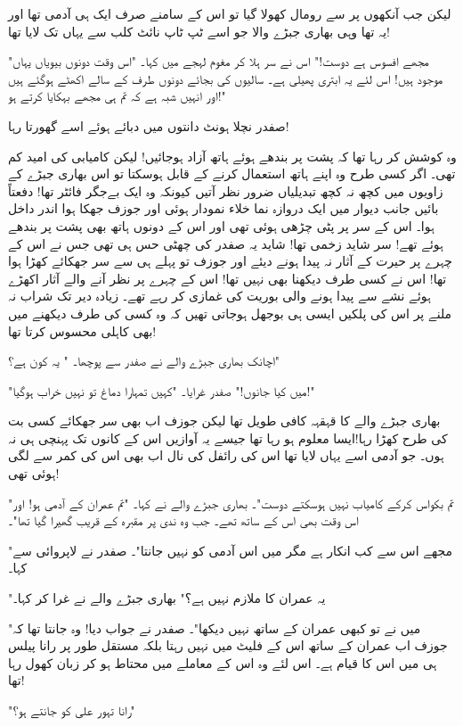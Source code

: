 لیکن جب آنکھوں پر سے رومال کھولا گیا تو اس کے سامنے صرف ایک ہی آدمی تھا اور یہ تھا وہی بھاری جبڑے والا جو اسے ٹپ ٹاپ نائٹ کلب سے یہاں تک لایا تھا!

"مجھے افسوس ہے دوست!" اس نے سر ہلا کر مغوم لہجے میں کہا۔ "اس وقت دونوں بیویاں یہاں موجود ہیں! اس لئے یہ ابتری پھیلی ہے۔ سالیوں کی بجائے دونوں طرف کے سالے اکھٹے ہوگئے ہیں اور انہیں شبہ ہے کہ تم ہی مجھے بہکایا کرتے ہو!"

صفدر نچلا ہونٹ دانتوں میں دبائے ہوئے اسے گھورتا رہا!

وہ کوشش کر رہا تھا کہ پشت پر بندھے ہوئے ہاتھ آزاد ہوجائیں! لیکن کامیابی کی امید کم تھی۔ اگر کسی طرح وہ اپنے ہاتھ استعمال کرنے کے قابل ہوسکتا تو اس بھاری جبڑے کے زاویوں میں کچھ نہ کچھ تبدیلیاں ضرور نظر آتیں کیونکہ وہ ایک بےجگر فائٹر تھا!
دفعتاً بائیں جانب دیوار میں ایک دروازہ نما خلاء نمودار ہوئی اور جوزف جھکا ہوا اندر داخل ہوا۔ اس کے سر پر پٹی چڑھی ہوئی تھی اور اس کے دونوں ہاتھ بھی پشت پر بندھے ہوئے تھے! سر شاید زخمی تھا! شاید یہ صفدر کی چھٹی حس ہی تھی جس نے اس کے چہرے پر حیرت کے آثار نہ پیدا ہونے دیئے اور جوزف تو پہلے ہی سے سر جھکائے کھڑا ہوا تھا! اس نے کسی طرف دیکھنا بھی نہیں تھا! اس کے چہرے پر نظر آنے والے آثار اکھڑے ہوئے نشے سے پیدا ہونے والی بوریت کی غمازی کر رہے تھے۔ زیادہ دیر تک شراب نہ ملنے پر اس کی پلکیں ایسی ہی بوجھل ہوجاتی تھیں کہ وہ کسی کی طرف دیکھنے میں بھی کاہلی محسوس کرتا تھا!

اچانک بھاری جبڑے والے نے صفدر سے پوچھا۔ " یہ کون ہے؟"

"میں کیا جانوں!" صفدر غرایا۔ "کہیں تمہارا دماغ تو نہیں خراب ہوگیا!"

بھاری جبڑے والے کا قہقہہ کافی طویل تھا لیکن جوزف اب بھی سر جھکائے کسی بت کی طرح کھڑا رہا!ایسا معلوم ہو رہا تھا جیسے یہ آوازیں اس کے کانوں تک پہنچی ہی نہ ہوں۔ جو آدمی اسے یہاں لایا تھا اس کی رائفل کی نال اب بھی اس کی کمر سے لگی ہوئی تھی!

"تم بکواس کرکے کامیاب نہیں ہوسکتے دوست"۔ بھاری جبڑے والے نے کہا۔ "تم عمران کے آدمی ہو! اور اس وقت بھی اس کے ساتھ تھے۔ جب وہ ندی پر مقبرہ کے قریب گھیرا گیا تھا"۔

"مجھے اس سے کب انکار ہے مگر میں اس آدمی کو نہیں جانتا"۔ صفدر نے لاپروائی سے کہا۔

"یہ عمران کا ملازم نہیں ہے؟" بھاری جبڑے والے نے غرا کر کہا۔

"میں نے تو کبھی عمران کے ساتھ نہیں دیکھا"۔ صفدر نے جواب دیا! وہ جانتا تھا کہ جوزف اب عمران کے ساتھ اس کے فلیٹ میں نہیں رہتا بلکہ مستقل طور پر رانا پیلس ہی میں اس کا قیام ہے۔ اس لئے وہ اس کے معاملے میں محتاط ہو کر زبان کھول رہا تھا!

"رانا تہور علی کو جانتے ہو؟"

